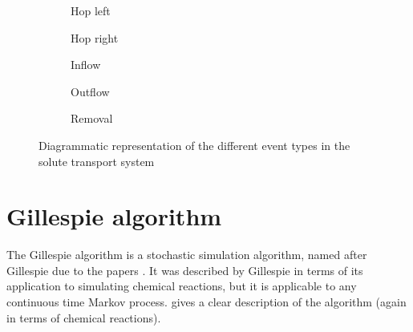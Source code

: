 \begin{figure}[ht!]
    \centering
    \begin{subfigure}[b]{0.3\textwidth}
        \centering
        {
        }
        \caption{Hop left}
    \end{subfigure}
    \qquad\qquad
    \begin{subfigure}[b]{0.3\textwidth}
        \centering
        {
        }
        \caption{Hop right}
    \end{subfigure}

    \begin{subfigure}[b]{0.3\textwidth}
        \centering
        {
        }
        \caption{Inflow}
    \end{subfigure}
    \qquad\qquad
    \begin{subfigure}[b]{0.3\textwidth}
        \centering
        {
        }
        \caption{Outflow}
    \end{subfigure}

    \begin{subfigure}[b]{0.3\textwidth}
        \centering
        {
        }
        \caption{Removal}
    \end{subfigure}
    \caption{\label{fig:transport_events}Diagrammatic representation of the
different event types in the solute transport system}
\end{figure}

\section{Gillespie algorithm}
The Gillespie algorithm is a stochastic simulation algorithm, named after
Gillespie due to the papers \cite{gillespie1976general,gillespie1977exact}. It
was described by Gillespie in terms of its application to simulating chemical
reactions, but it is applicable to any continuous time Markov process.
\cite{anderson2007modified} gives a clear description of the algorithm (again in
terms of chemical reactions).

